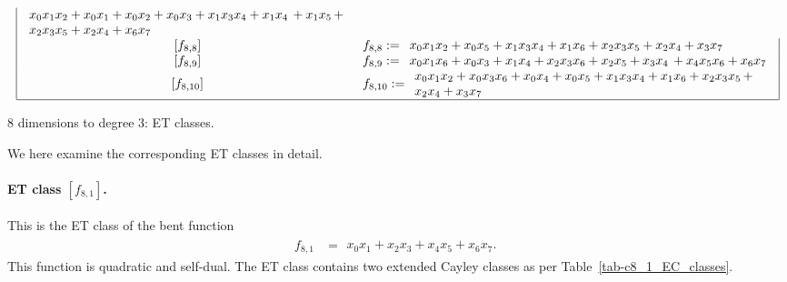 \begin{table}[!bhpt]
\begin{align*}
\begin{array}{|cl|}
\begin{array}{l}
x_{0} x_{1} x_{2} + x_{0} x_{1} + x_{0} x_{2} + x_{0} x_{3} + x_{1} x_{3} x_{4} + x_{1} x_{4}\, +
x_{1} x_{5}\, +
\\
x_{2} x_{3} x_{5} + x_{2} x_{4} + x_{6} x_{7}
\end{array}
\\
\,[f_{ 8 , 8 }] & f_{ 8 , 8 } :=
\begin{array}{l}
x_{0} x_{1} x_{2} + x_{0} x_{5} + x_{1} x_{3} x_{4} + x_{1} x_{6} + x_{2} x_{3} x_{5} + x_{2} x_{4}
+ x_{3} x_{7}
\end{array}
\\
\,[f_{ 8 , 9 }] & f_{ 8 , 9 } :=
\begin{array}{l}
x_{0} x_{1} x_{6} + x_{0} x_{3} + x_{1} x_{4} + x_{2} x_{3} x_{6} + x_{2} x_{5} + x_{3} x_{4}\, +
x_{4} x_{5} x_{6} + x_{6} x_{7}
\end{array}
\\
\,[f_{ 8 , 10 }] & f_{ 8 , 10 } :=
\begin{array}{l}
x_{0} x_{1} x_{2} + x_{0} x_{3} x_{6} + x_{0} x_{4} + x_{0} x_{5} + x_{1} x_{3} x_{4} + x_{1} x_{6}
+ x_{2} x_{3} x_{5}\, +
\\
x_{2} x_{4} + x_{3} x_{7}
\end{array}
\\
\hline
\end{array}
\end{align*}
\normalsize{}
\caption{8 dimensions to degree 3: ET classes.}
\label{tab-c8_ET_classes}
\end{table}
We here examine the corresponding ET classes in detail.
\newpage
\paragraph*{ET class $[f_{8,1}]$.}
%
This is the ET class of the bent function
\small{}
\begin{align*}
f_{ 8 , 1 } &=
\begin{array}{l}
x_{0} x_{1} + x_{2} x_{3} + x_{4} x_{5} + x_{6} x_{7}.
\end{array}
\end{align*}
\normalsize{}
This function is quadratic and self-dual.
The ET class contains two extended Cayley classes as per Table~\ref{tab-c8_1_EC_classes}.

